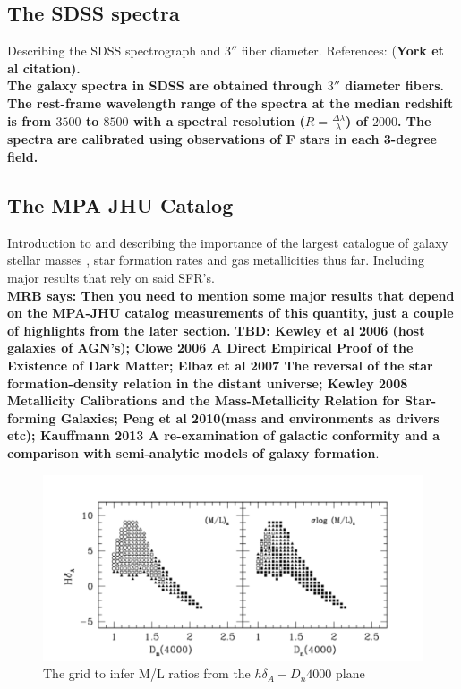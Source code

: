 \subsection{The SDSS spectra}
Describing the SDSS spectrograph and $3''$ fiber diameter. References: \citep{smee_multi-object_2013} (\bf York et al citation).\\
The galaxy spectra in SDSS are obtained through $3''$ diameter fibers. The rest-frame wavelength range of the spectra at the median redshift is from $3500$ to $8500$ with a spectral resolution ($R = \frac{\Delta \lambda}{\lambda}$) of $2000$. The spectra are calibrated using observations of F stars in each 3-degree field.

\subsection{The MPA JHU Catalog}
Introduction to and describing the importance of the largest catalogue of galaxy stellar masses \citep{kauffmann_stellar_2003}, star formation rates \citep{brinchmann_physical_2004} and gas metallicities \citep{tremonti_origin_2004} thus far. Including major results that rely on said SFR's.\\
{\bf MRB says: Then you need to mention some major results that depend
on the MPA-JHU catalog measurements of this quantity, just a couple of 
highlights from the later section. }{\bf TBD:  Kewley et al 2006 (host galaxies of AGN's); Clowe 2006 A Direct Empirical Proof of the Existence of Dark Matter; Elbaz et al 2007 The reversal of the star formation-density relation in the distant
universe; Kewley 2008 Metallicity Calibrations and the Mass-Metallicity Relation for Star-forming Galaxies; Peng et al 2010(mass and environments as drivers etc); Kauffmann 2013 A re-examination of galactic conformity and a comparison with semi-analytic models of galaxy formation}.


\begin{figure}
\includegraphics[width=\textwidth]{figures/Kauffmann_grid}
\caption[Short figure name.]{The \citet{kauffmann_stellar_2003} grid to infer M/L ratios from the $h\delta_{A}-D_{n}4000$ plane
\label{fig:myInlineFigure}}
\end{figure}

